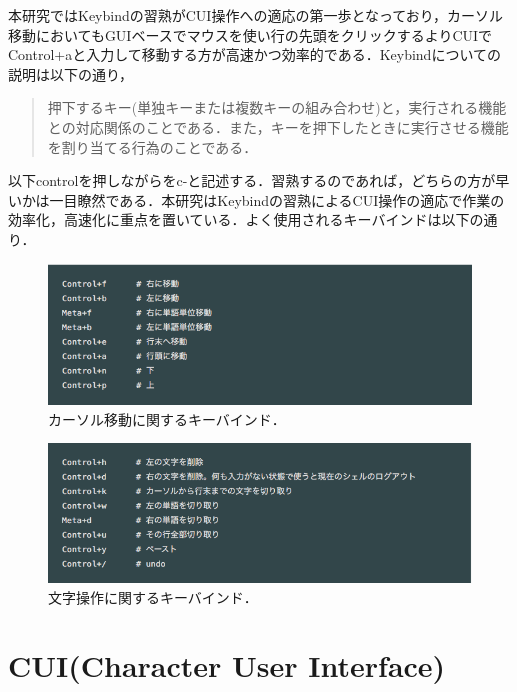 本研究ではKeybindの習熟がCUI操作への適応の第一歩となっており，カーソル移動においてもGUIベースでマウスを使い行の先頭をクリックするよりCUIでControl+aと入力して移動する方が高速かつ効率的である．Keybindについての説明は以下の通り，
\begin{quotation}
押下するキー(単独キーまたは複数キーの組み合わせ)と，実行される機能との対応関係のことである．また，キーを押下したときに実行させる機能を割り当てる行為のことである． \cite{keybind}
\end{quotation}
以下controlを押しながらをc-と記述する．習熟するのであれば，どちらの方が早いかは一目瞭然である．本研究はKeybindの習熟によるCUI操作の適応で作業の効率化，高速化に重点を置いている．よく使用されるキーバインドは以下の通り．
\begin{figure}[H]
\centering
\begin{center}
\includegraphics[width=150mm]{../../picture/keybind1.png}
\end{center}
\caption{カーソル移動に関するキーバインド．\label{sample}}
\end{figure}

\begin{figure}[H]
\centering
\begin{center}
\includegraphics[width=150mm]{../../picture/keybind2.png}
\end{center}
\caption{文字操作に関するキーバインド．\label{sample}}
\end{figure}

    \section{CUI(Character User
Interface)}\label{cuicharacter-user-interface}

